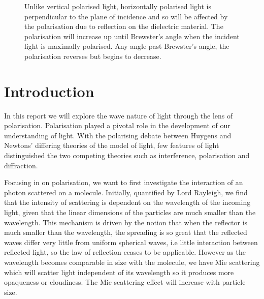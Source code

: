 \documentclass{article}
\begin{document}
\begin{figure} [H]
    \centering
    \scalebox{0.75}{}
    \caption{Unlike vertical polarised light, horizontally polarised light
    is perpendicular to the plane of incidence and so will be affected 
    by the polarisation due to reflection on the dielectric material. The 
    polarisation will increase up until Brewster's angle when the incident 
    light is maximally polarised. Any angle past Brewster's angle, the 
    polarisation reverses but begins to decrease.}
\end{figure}

\section{Introduction}
In this report we will explore the wave nature of light through the lens of 
polarisation. Polarisation played a pivotal role in the development of our 
understanding of light. With the polarising debate between Huygens and Newtons'
differing theories of the model of light, few features of light distinguished 
the two competing theories such as interference, polarisation and diffraction. 

Focusing in on polarisation, we want to first investigate the interaction of 
an photon scattered on a molecule. Initially, quantified by Lord Rayleigh, 
we find that the intensity of scattering is dependent on the wavelength of the 
incoming light, given that the linear dimensions of the particles are much 
smaller than the wavelength. This mechanism is driven by the notion that when 
the reflector is much smaller than the wavelength, the spreading is so great 
that the reflected waves differ very little from uniform spherical waves, i.e
little interaction between reflected light, so the law of reflection ceases 
to be applicable. However as the wavelength becomes comparable in size with 
the molecule, we have Mie scattering which will scatter light independent of 
its wavelength so it produces more opaqueness or cloudiness. The Mie scattering 
effect will increase with particle size.
\end{document}
